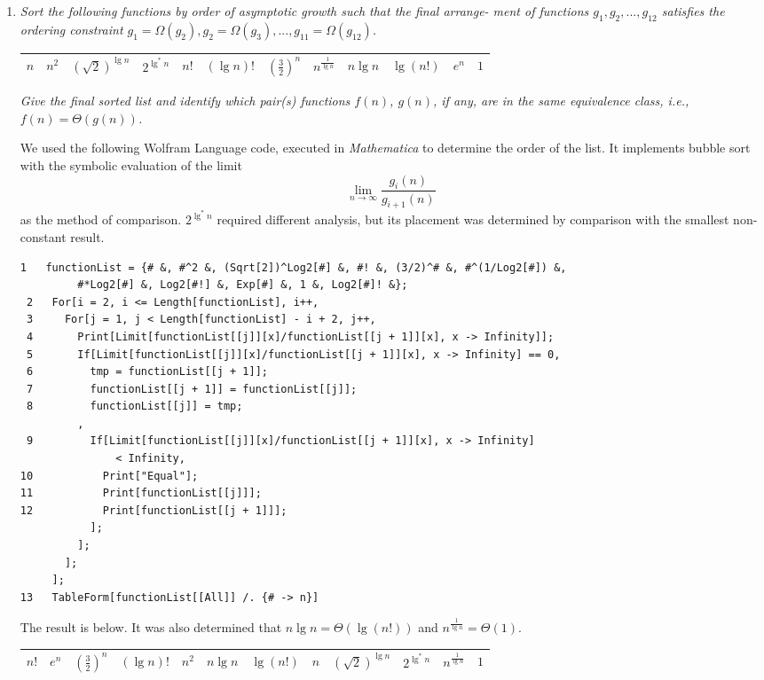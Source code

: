 \documentclass[12pt]{article}
\begin{document}
\begin{enumerate}
    \newpage
    \item \textit{Sort the following functions by order of asymptotic growth such that the final arrange-
ment of functions $g_1, g_2,..., g_{12}$ satisfies the ordering constraint $g_1 = \Omega(g_2), g_2 = \Omega(g_3),
..., g_{11} = \Omega(g_{12})$.}
    \begin{center}
	    \begin{tabular}{|c|c|c|c|c|c|c|c|c|c|c|c|}
        	\hline
    		$n$ & $n^2$ & $(\sqrt{2})^{\lg n}$ & $2^{\lg^*n}$ & $n!$ & $(\lg n)!$ & $(\frac{3}{2})^n$ & $n^{\frac{1}{\lg n}}$ & $n \lg n$ & $\lg(n!)$ & $e^n$ & $1$ \\
            \hline
    	\end{tabular}
    \end{center}
	\textit{Give the final sorted list and identify which pair(s) functions $f(n)$, $g(n)$, if any, are in
the same equivalence class, i.e., $f(n) = \Theta(g(n))$.}

	We used the following Wolfram Language code, executed in \textit{Mathematica} to determine the order of the list. It implements bubble sort with the symbolic evaluation of the limit
    \[
    	\lim_{n\rightarrow\infty} \frac{g_i(n)}{g_{i+1}(n)}
    \]
    as the method of comparison. $2^{\lg^{*}n}$ required different analysis, but its placement was determined by comparison with the smallest non-constant result.
    
    \begin{Verbatim}[fontsize=\footnotesize]
 1   functionList = {# &, #^2 &, (Sqrt[2])^Log2[#] &, #! &, (3/2)^# &, #^(1/Log2[#]) &,
         #*Log2[#] &, Log2[#!] &, Exp[#] &, 1 &, Log2[#]! &};
 2   For[i = 2, i <= Length[functionList], i++,
 3     For[j = 1, j < Length[functionList] - i + 2, j++,
 4       Print[Limit[functionList[[j]][x]/functionList[[j + 1]][x], x -> Infinity]];
 5       If[Limit[functionList[[j]][x]/functionList[[j + 1]][x], x -> Infinity] == 0,
 6         tmp = functionList[[j + 1]];
 7         functionList[[j + 1]] = functionList[[j]];
 8         functionList[[j]] = tmp;
         ,
 9         If[Limit[functionList[[j]][x]/functionList[[j + 1]][x], x -> Infinity] 
               < Infinity,
10           Print["Equal"];
11           Print[functionList[[j]]];
12           Print[functionList[[j + 1]]];
           ];
         ];
       ];
     ];
13   TableForm[functionList[[All]] /. {# -> n}]
    \end{Verbatim}
    
    The result is below. It was also determined that $n\lg n = \Theta (\lg(n!))$ and $n^{\frac{1}{\lg n}} = \Theta (1)$.
    \begin{center}
	    \begin{tabular}{|c|c|c|c|c|c|c|c|c|c|c|c|}
        	\hline
            $n!$ & $e^n$ & $(\frac{3}{2})^n$ & $(\lg n)!$ & $n^2$ & $n \lg n$ & $\lg(n!)$ & $n$ & $(\sqrt{2})^{\lg n}$ & $2^{\lg^* n}$ & $n^{\frac{1}{\lg n}}$ & $1$\\
            \hline
    	\end{tabular}
    \end{center}

\end{enumerate}
\end{document}
